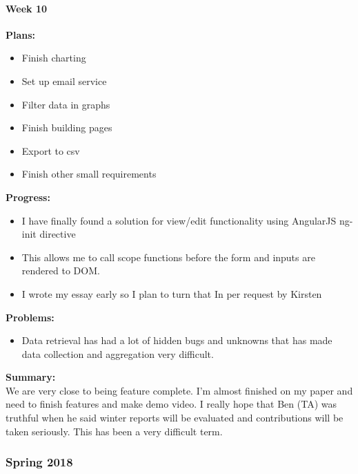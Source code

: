 \paragraph{Week 10}
\begin{adjustwidth}{2.5em}{0pt} 
    \vspace{-0.5cm}\textbf{Plans:}
    \vspace{-0.5cm}
    \begin{itemize}
        \item Finish charting
        \item Set up email service
        \item Filter data in graphs
        \item Finish building pages
        \item Export to csv
        \item Finish other small requirements
    \end{itemize} 
    \vspace{-0.3cm}\textbf{Progress:}
    \vspace{-0.5cm}
    \begin{itemize}
        \item I have finally found a solution for view/edit functionality using AngularJS ng-init directive
        \item This allows me to call scope functions before the form and inputs are rendered to DOM.
        \item I wrote my essay early so I plan to turn that In per request by Kirsten
    \end{itemize} 
    \vspace{-0.3cm}\textbf{Problems:}
    \vspace{-0.5cm}
    \begin{itemize}
        \item Data retrieval has had a lot of hidden bugs and unknowns that has made data collection and aggregation very difficult.
    \end{itemize} 
    \vspace{-0.3cm}\noindent\textbf{Summary:}\\
    \noindent We are very close to being feature complete. I'm almost finished on my paper and need to finish features and make demo video. I really hope that Ben (TA) was truthful when he said winter reports will be evaluated and contributions will be taken seriously. This has been a very difficult term.
\end{adjustwidth} 
\subsubsection{Spring 2018}
